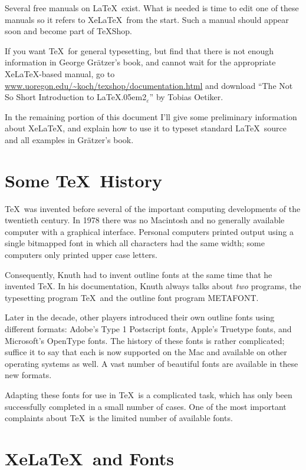 \documentclass[11pt, oneside]{amsart}
\def\LaTeXe{\LaTeX{}\kern.05em2$_{\textstyle\varepsilon}$}
\begin{document}
\begin{multicols}{2}
Several free manuals on \LaTeX\ exist. What is needed is time to edit one of these manuals so it refers to Xe\LaTeX\ from the start. Such a manual should appear soon and become part of TeXShop.

If you want \TeX\ for general typesetting, but find that there is not enough information in George Gr\"atzer's book, and cannot wait for the appropriate Xe\LaTeX-based manual, go to \url{www.uoregon.edu/~koch/texshop/documentation.html} and download  ``The Not So Short Introduction to \LaTeXe'' by Tobias Oetiker. 

In the remaining portion of this document I'll give some preliminary information about Xe\LaTeX, and explain how to use it to typeset standard \LaTeX\ source and all examples in Gr\"atzer's book.

\section{Some \TeX\ History}

\TeX\ was invented before several of the important computing developments of the twentieth century. In 1978 there was no Macintosh and no generally available computer with a graphical interface. Personal computers printed output using a single bitmapped font in which all characters had the same width; some computers only printed upper case letters.

Consequently, Knuth had to invent outline fonts at the same time that he invented \TeX. In his documentation, Knuth always talks about \emph{two} programs, the typesetting program \TeX\ and the outline font program METAFONT.

Later in the decade, other players introduced their own outline fonts using different formats: Adobe's Type 1 Postscript fonts, Apple's Truetype fonts, and Microsoft's OpenType fonts. The history of these fonts is rather complicated; suffice it to say that each is now supported on the Mac and available on other operating systems as well. A vast number of beautiful fonts are available in these new formats.

Adapting these fonts for use in \TeX\ is a complicated task, which has only been successfully completed in a small number of cases. One of the most important complaints about \TeX\ is the limited number of available fonts. 

\section{Xe\LaTeX\ and Fonts}


\end{multicols}
\end{document}
